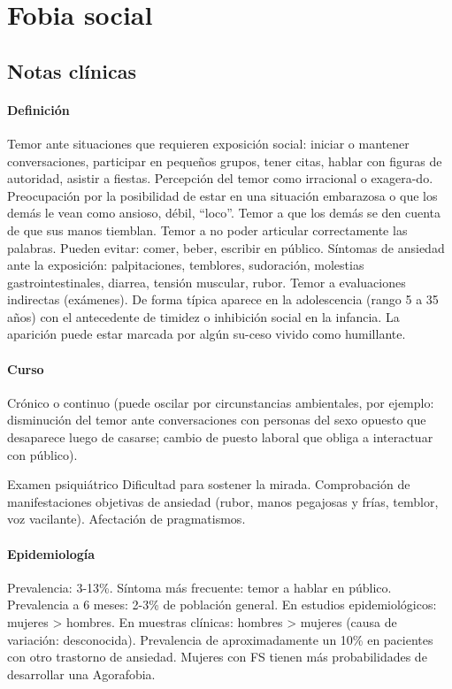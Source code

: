 \chapter*{Fobia social}
\section*{Notas clínicas}
\subsubsection*{Definición}
Temor ante situaciones que requieren exposición social: iniciar o mantener conversaciones, participar en pequeños grupos, tener citas, hablar con figuras de autoridad, asistir a fiestas. Percepción del temor como irracional o exagera-do. Preocupación por la posibilidad de estar en una situación embarazosa o que los demás le vean como ansioso, débil, “loco”. Temor a que los demás se den cuenta de que sus manos tiemblan. Temor a no poder articular correctamente las palabras. Pueden evitar: comer, beber, escribir en público. Síntomas de ansiedad ante la exposición: palpitaciones, temblores, sudoración, molestias gastrointestinales, diarrea, tensión muscular, rubor. Temor a evaluaciones indirectas (exámenes). De forma típica aparece en la adolescencia (rango 5 a 35 años) con el antecedente de timidez o inhibición social en la infancia. La aparición puede estar marcada por algún su-ceso vivido como humillante.
\subsubsection*{Curso}
Crónico o continuo (puede oscilar por circunstancias ambientales, por ejemplo: disminución del temor ante conversaciones con personas del sexo opuesto que desaparece luego de casarse; cambio de puesto laboral que obliga a interactuar con público).

Examen psiquiátrico Dificultad para sostener la mirada. Comprobación de manifestaciones objetivas de ansiedad (rubor, manos pegajosas y frías, temblor, voz vacilante). Afectación de pragmatismos.
\subsubsection*{Epidemiología}
Prevalencia: 3-13\%. Síntoma más frecuente: temor a hablar en público. Prevalencia a 6 meses: 2-3\% de población general. En estudios epidemiológicos: mujeres > hombres. En muestras clínicas: hombres > mujeres (causa de variación: desconocida). Prevalencia de aproximadamente un 10\% en pacientes con otro trastorno de ansiedad. Mujeres con FS tienen más probabilidades de desarrollar una Agorafobia.
